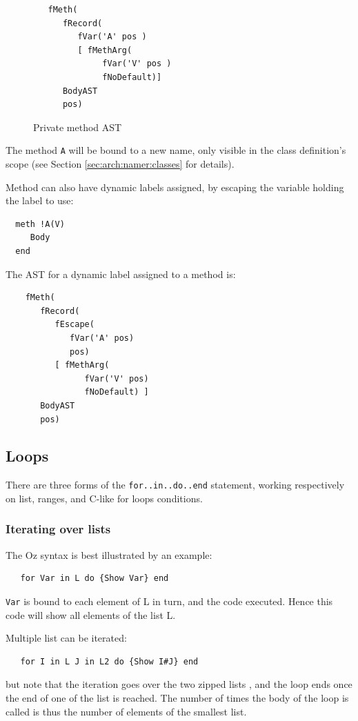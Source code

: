 \documentclass[a4paper]{memoir}
\begin{document}
\begin{figure}[h]
\begin{lstlisting}
   fMeth(
      fRecord(
         fVar('A' pos )
         [ fMethArg(
              fVar('V' pos )
              fNoDefault)]
      BodyAST
      pos)
\end{lstlisting}
\caption{Private method AST}
\label{fig:privatemeth}
\end{figure}

The method \lstinline!A! will be bound to a new name, only visible in the class
definition's scope (see Section \ref{sec:arch:namer:classes} for details).

Method can also have dynamic labels assigned, by escaping the variable holding
the label to use:
\begin{lstlisting}
  meth !A(V)
     Body
  end
\end{lstlisting}
The AST for a dynamic label assigned to a method is:
\begin{lstlisting}
    fMeth(
       fRecord(
          fEscape(
             fVar('A' pos)
             pos)
          [ fMethArg(
                fVar('V' pos)
                fNoDefault) ]
       BodyAST
       pos)

\end{lstlisting}

\subsection{Loops}
There are three forms of the \lstinline!for..in..do..end! statement, working
respectively on list, ranges, and C-like for loops conditions.
\subsubsection{Iterating over lists}
The Oz syntax is best illustrated by an example:
\begin{lstlisting}
   for Var in L do {Show Var} end
\end{lstlisting}
\lstinline!Var! is bound to each element of L in turn, and the code executed.
Hence this code will show all elements of the list L.

Multiple list can be iterated:
\begin{lstlisting}
   for I in L J in L2 do {Show I#J} end
\end{lstlisting}
but note that the iteration goes over the two zipped lists , and the loop ends once the
end of one of the list is reached. The number of times the body of the loop is
called is thus the number of elements of the smallest list.
\end{document}
